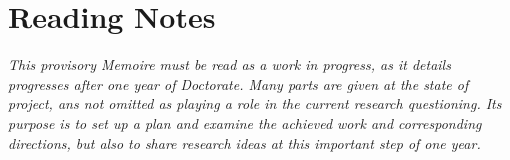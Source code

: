 



\begingroup
\let\clearpage\relax
\let\cleardoublepage\relax
\let\cleardoublepage\relax

\chapter*{Reading Notes}

\textit{This provisory Memoire must be read as a work in progress, as it details progresses after one year of Doctorate. Many parts are given at the state of project, ans not omitted as playing a role in the current research questioning. Its purpose is to set up a plan and examine the achieved work and corresponding directions, but also to share research ideas at this important step of one year.}




\endgroup			

\vfill



